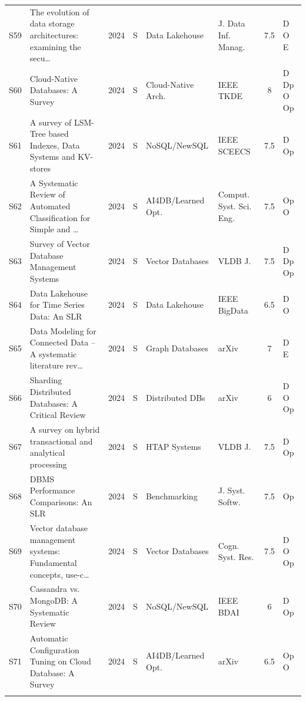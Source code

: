 \documentclass[a4paper,fleqn]{cas-sc}
\begin{document}
\begin{landscape}
\begin{longtable}{c p{3.5cm} c c p{2.45cm} p{2.3cm} c p{1.5cm}}
\addlinespace
S59 & The evolution of data storage architectures: examining the secu\ldots{}~\cite{Janssen2024Lakehouse} & 2024 & S & Data Lakehouse & J. Data Inf. Manag. & 7.5 & D O E \\
\addlinespace
S60 & Cloud-Native Databases: A Survey~\cite{Li2024CloudNativeSurvey} & 2024 & S & Cloud-Native Arch. & IEEE TKDE & 8 & D Dp O Op \\
\addlinespace
S61 & A survey of LSM-Tree based Indexes, Data Systems and KV-stores~\cite{Mishra2024NoSQL} & 2024 & S & NoSQL/NewSQL & IEEE SCEECS & 7.5 & D Op \\
\addlinespace
S62 & A Systematic Review of Automated Classification for Simple and \ldots{}~\cite{Nurhadi2024AI4DB} & 2024 & S & AI4DB/Learned Opt. & Comput. Syst. Sci. Eng. & 7.5 & Op O \\
\addlinespace
S63 & Survey of Vector Database Management Systems~\cite{Pan2024VectorDB} & 2024 & S & Vector Databases & VLDB J. & 7.5 & D Dp Op \\
\addlinespace
S64 & Data Lakehouse for Time Series Data: An SLR~\cite{Pohl2024LakehouseTS} & 2024 & S & Data Lakehouse & IEEE BigData & 6.5 & D O \\
\addlinespace
S65 & Data Modeling for Connected Data -- A systematic literature rev\ldots{}~\cite{Santos2024GraphDB} & 2024 & S & Graph Databases & arXiv & 7 & D E \\
\addlinespace
S66 & Sharding Distributed Databases: A Critical Review~\cite{Solat2024DistDB} & 2024 & S & Distributed DBs & arXiv & 6 & D O Op \\
\addlinespace
S67 & A survey on hybrid transactional and analytical processing~\cite{Song2024HTAP} & 2024 & S & HTAP Systems & VLDB J. & 7.5 & D Op \\
\addlinespace
S68 & DBMS Performance Comparisons: An SLR~\cite{Taipalus2024DBMSPerf} & 2024 & S & Benchmarking & J. Syst. Softw. & 7.5 & Op \\
\addlinespace
S69 & Vector database management systems: Fundamental concepts, use-c\ldots{}~\cite{Taipalus2024VectorDB} & 2024 & S & Vector Databases & Cogn. Syst. Res. & 7.5 & D O Op \\
\addlinespace
S70 & Cassandra vs. MongoDB: A Systematic Review~\cite{Tu2024CassandraMongo} & 2024 & S & NoSQL/NewSQL & IEEE BDAI & 6 & D Op \\
\addlinespace
S71 & Automatic Configuration Tuning on Cloud Database: A Survey~\cite{Zhang2024AI4DB} & 2024 & S & AI4DB/Learned Opt. & arXiv & 6.5 & Op O \\
\addlinespace

\end{longtable}
\end{landscape}
\end{document}

